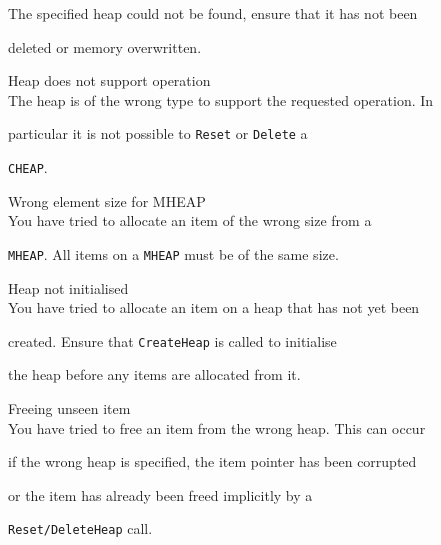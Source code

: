 \begin{itemize}
\begin{itemize}
        The specified heap could not be found, ensure that it has not been 


        deleted or memory overwritten.





    Heap does not support operation\\


        The heap is of the wrong type to support the requested operation.  In 


        particular it is not possible to \texttt{Reset} or \texttt{Delete} a


        \texttt{CHEAP}.





    Wrong element size for MHEAP\\


        You have tried to allocate an item of the wrong size from a 


        \texttt{MHEAP}. All items on a \texttt{MHEAP} must be of the same size.





    Heap not initialised\\


        You have tried to allocate an item on a heap that has not yet been 


        created.  Ensure that \texttt{CreateHeap} is called to initialise 


        the heap before any items are allocated from it.





    Freeing unseen item\\


        You have tried to free an item from the wrong heap.  This can occur


        if the wrong heap is specified, the item pointer has been corrupted 


        or the item has already been freed implicitly by a 


        \texttt{Reset/DeleteHeap} call.  





\end{itemize}


 





\end{itemize}

